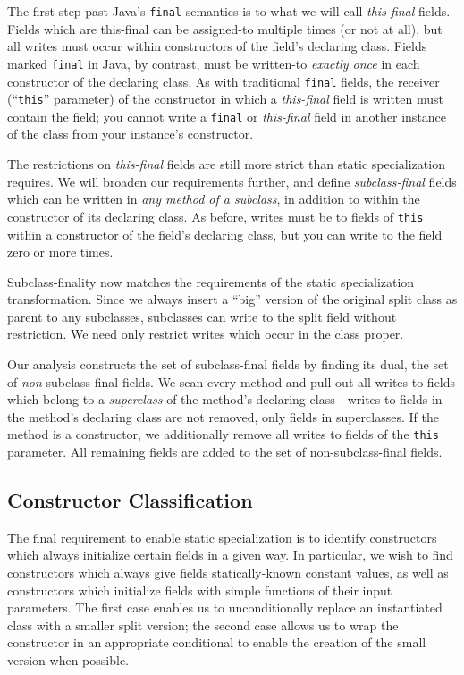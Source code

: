 \documentclass[oribibl]{llncs}
\begin{document}
The first step past Java's {\tt final} semantics is to what we
will call {\it this-final} fields.  Fields which are this-final can
be assigned-to multiple times (or not at all), but all writes must
occur within constructors of the field's declaring class.
Fields marked {\tt final} in Java, by
contrast, must be written-to {\it exactly once} in each constructor of
the declaring class.
As with traditional {\tt final} fields, the receiver (``{\tt this}''
parameter) of the
constructor in which a {\it this-final} field is written must contain
the field;  you cannot write a {\tt final} or {\it this-final}
field in another instance of the class from your instance's
constructor.

The restrictions on {\it this-final} fields are still more strict than
static specialization requires.  We will broaden our requirements
further, and define
{\it subclass-final} fields which can be written in {\it any method of
  a subclass}, in addition to within the constructor of its declaring
class.  As before, writes must be to fields of {\tt this} within a
constructor of the field's declaring class, but you
can write to the field zero or more times.

Subclass-finality now matches the requirements of the static
specialization transformation.  Since we always insert a ``big''
version of the original split class as parent to any subclasses,
subclasses can write to the split field without restriction.
We need only restrict writes which occur in the class proper.

Our analysis constructs the set of subclass-final fields by finding
its dual, the set of {\it non}-subclass-final fields.  We scan every
method and pull out all writes to fields which belong to
a {\it superclass} of the method's declaring class---writes to fields
in the method's declaring class are not removed, only fields in
superclasses.  If the method is a constructor, we additionally remove
all writes to fields of the {\tt this} parameter.  All remaining
fields are added to the set of non-subclass-final fields.

\subsection{Constructor Classification}
The final requirement to enable static specialization is to identify
constructors which always initialize certain fields in a given way.
In particular, we wish to find constructors which always give fields
statically-known constant values, as well as constructors which
initialize fields with simple functions of their input parameters.
The first case enables us to unconditionally replace an instantiated
class with a smaller split version; the second case allows us to wrap
the constructor in an appropriate conditional to enable the creation
of the small version when possible.
\end{document}
